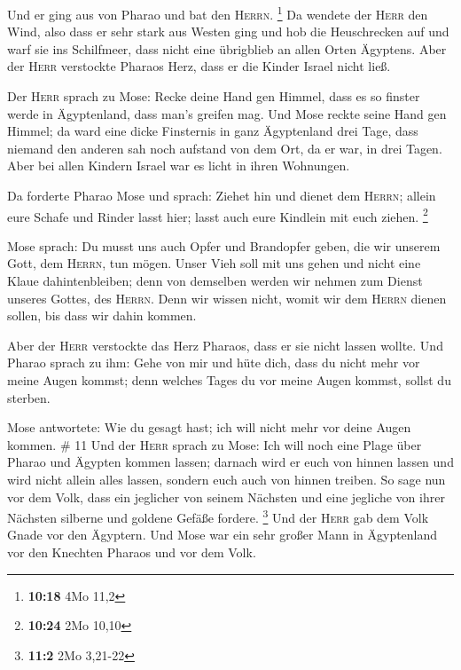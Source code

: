  Und er ging aus von Pharao und bat den \textsc{Herrn}.
\footnote{\textbf{10:18} 4Mo 11,2}  Da wendete der
\textsc{Herr} den Wind, also dass er sehr stark aus Westen ging und hob
die Heuschrecken auf und warf sie ins Schilfmeer, dass nicht eine
übrigblieb an allen Orten Ägyptens.  Aber der
\textsc{Herr} verstockte Pharaos Herz, dass er die Kinder Israel nicht
ließ.

 Der \textsc{Herr} sprach zu Mose: Recke deine Hand gen
Himmel, dass es so finster werde in Ägyptenland, dass man's greifen mag.
 Und Mose reckte seine Hand gen Himmel; da ward eine
dicke Finsternis in ganz Ägyptenland drei Tage,  dass
niemand den anderen sah noch aufstand von dem Ort, da er war, in drei
Tagen. Aber bei allen Kindern Israel war es licht in ihren Wohnungen.

 Da forderte Pharao Mose und sprach: Ziehet hin und
dienet dem \textsc{Herrn}; allein eure Schafe und Rinder lasst hier;
lasst auch eure Kindlein mit euch ziehen. \footnote{\textbf{10:24} 2Mo
  10,10}

 Mose sprach: Du musst uns auch Opfer und Brandopfer
geben, die wir unserem Gott, dem \textsc{Herrn}, tun mögen.
 Unser Vieh soll mit uns gehen und nicht eine Klaue
dahintenbleiben; denn von demselben werden wir nehmen zum Dienst unseres
Gottes, des \textsc{Herrn}. Denn wir wissen nicht, womit wir dem
\textsc{Herrn} dienen sollen, bis dass wir dahin kommen.

 Aber der \textsc{Herr} verstockte das Herz Pharaos, dass
er sie nicht lassen wollte.  Und Pharao sprach zu ihm:
Gehe von mir und hüte dich, dass du nicht mehr vor meine Augen kommst;
denn welches Tages du vor meine Augen kommst, sollst du sterben.

 Mose antwortete: Wie du gesagt hast; ich will nicht mehr
vor deine Augen kommen. \# 11  Und der \textsc{Herr}
sprach zu Mose: Ich will noch eine Plage über Pharao und Ägypten kommen
lassen; darnach wird er euch von hinnen lassen und wird nicht allein
alles lassen, sondern euch auch von hinnen treiben.  So
sage nun vor dem Volk, dass ein jeglicher von seinem Nächsten und eine
jegliche von ihrer Nächsten silberne und goldene Gefäße fordere.
\footnote{\textbf{11:2} 2Mo 3,21-22}  Und der
\textsc{Herr} gab dem Volk Gnade vor den Ägyptern. Und Mose war ein sehr
großer Mann in Ägyptenland vor den Knechten Pharaos und vor dem Volk.

